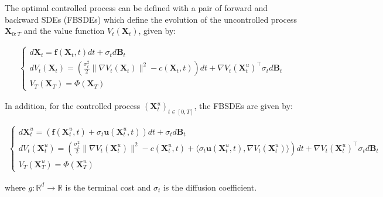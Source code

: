 \documentclass{article}
\begin{document}
\begin{proposition}\label{prop:soc-fbsdes}
    The optimal controlled process can be defined with a pair of forward and backward SDEs (FBSDEs) which define the evolution of the uncontrolled process $\boldsymbol{X}_{0:T}$ and the value function $V_t(\boldsymbol{X}_t)$, given by:
    \begin{small}
    \begin{align}
    \begin{cases}
        d\boldsymbol{X}_t=\boldsymbol{f}(\boldsymbol{X}_t,t)dt+\sigma_td\boldsymbol{B}_t\\
        dV_t(\boldsymbol{X}_t)=\left(\frac{\sigma^2_t}{2}\|\nabla V_t(\boldsymbol{X}_t)\|^2-c(\boldsymbol{X}_t,t)\right)dt+\nabla V_t(\boldsymbol{X}^u_t)^\top \sigma_t d\boldsymbol{B}_t\\ V_T(\boldsymbol{X}_T)=\Phi(\boldsymbol{X}_T)
    \end{cases}
    \end{align}
    \end{small}
    In addition, for the controlled process $(\boldsymbol{X}^u_t)_{t\in [0,T]}$, the FBSDEs are given by:
    \begin{small}
    \begin{align}
    \begin{cases}
        d\boldsymbol{X}^u_t=(\boldsymbol{f}(\boldsymbol{X}^u_t,t)+\sigma_t\boldsymbol{u}(\boldsymbol{X}^u_t,t))dt+\sigma_td\boldsymbol{B}_t\\
        dV_t(\boldsymbol{X}^u_t)=\left(\frac{\sigma^2_t}{2}\|\nabla V_t(\boldsymbol{X}^u_t)\|^2-c(\boldsymbol{X}^u_t,t)+\langle \sigma_t\boldsymbol{u}(\boldsymbol{X}^u_t,t), \nabla V_t(\boldsymbol{X}^u_t)\rangle\right)dt+\nabla V_t(\boldsymbol{X}^u_t)^\top \sigma_t d\boldsymbol{B}_t\\
        V_T(\boldsymbol{X}^u_T)=\Phi(\boldsymbol{X}^u_T)
    \end{cases}
    \end{align}
    \end{small}
    where $g:\mathbb{R}^d\to \mathbb{R}$ is the terminal cost and $\sigma_t$ is the diffusion coefficient. 
\end{proposition}
\end{document}
